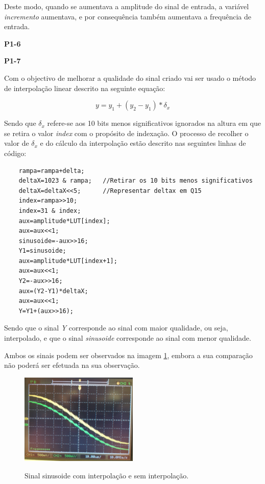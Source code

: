 \documentclass[11pt]{article}
\begin{document}
Deste modo, quando se aumentava a amplitude do sinal de entrada, a variável \textit{incremento} aumentava, e por consequência também aumentava a frequência de entrada.

\textbf{P1-6}
\label{para:P1-6}

\textbf{P1-7}
\label{para:P1-7}

Com o objectivo de melhorar a qualidade do sinal criado vai ser usado o método de interpolação linear descrito na seguinte equação:

\begin{equation}
y=y_{1}+(y_{2}-y_{1})*\delta_{x}
\end{equation}

Sendo que $ \delta_{x} $ refere-se aos 10 bits menos significativos ignorados na altura em que se retira o valor \textit{index} com o propósito de indexação. O processo de recolher o valor de $ \delta_{x} $ e do cálculo da interpolação estão descrito nas seguintes linhas de código:

\begin{lstlisting}
	rampa=rampa+delta;
	deltaX=1023 & rampa;   //Retirar os 10 bits menos significativos
	deltaX=deltaX<<5;      //Representar deltax em Q15
	index=rampa>>10;
	index=31 & index; 
	aux=amplitude*LUT[index];
	aux=aux<<1;
	sinusoide=-aux>>16;
	Y1=sinusoide;
	aux=amplitude*LUT[index+1];
	aux=aux<<1;
	Y2=-aux>>16;
	aux=(Y2-Y1)*deltaX;
	aux=aux<<1;
	Y=Y1+(aux>>16);
\end{lstlisting}

Sendo que o sinal \textit{Y} corresponde ao sinal com maior qualidade, ou seja, interpolado, e que o sinal \textit{sinusoide} corresponde ao sinal com menor qualidade.

Ambos os sinais podem ser observados na imagem \ref{fig:interp}, embora a sua comparação não poderá ser efetuada na sua observação.


\begin{figure}[H]
	\centering
	\label{fig:interp}
	\includegraphics[width=0.5\textwidth]{./P1_interp}~\\
	\caption{Sinal sinusoide com interpolação e sem interpolação.}
\end{figure}
\end{document}
